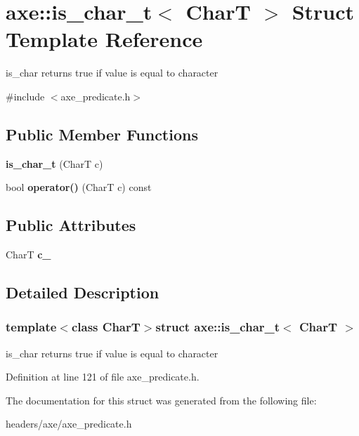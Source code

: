 \hypertarget{structaxe_1_1is__char__t}{\section{axe\+:\+:is\+\_\+char\+\_\+t$<$ Char\+T $>$ Struct Template Reference}
\label{structaxe_1_1is__char__t}
}


is\+\_\+char returns true if value is equal to character  




{\ttfamily \#include $<$axe\+\_\+predicate.\+h$>$}

\subsection*{Public Member Functions}
\begin{DoxyCompactItemize}
\item 
\hypertarget{structaxe_1_1is__char__t_ab077faece6bfee5c0fe9cbf96c6b22ad}{{\bfseries is\+\_\+char\+\_\+t} (Char\+T c)}\label{structaxe_1_1is__char__t_ab077faece6bfee5c0fe9cbf96c6b22ad}

\item 
\hypertarget{structaxe_1_1is__char__t_a4b1b9d98521ee046d0fae5868b6c398a}{bool {\bfseries operator()} (Char\+T c) const }\label{structaxe_1_1is__char__t_a4b1b9d98521ee046d0fae5868b6c398a}

\end{DoxyCompactItemize}
\subsection*{Public Attributes}
\begin{DoxyCompactItemize}
\item 
\hypertarget{structaxe_1_1is__char__t_a036d3145d58a31b553e5cad48391ec54}{Char\+T {\bfseries c\+\_\+}}\label{structaxe_1_1is__char__t_a036d3145d58a31b553e5cad48391ec54}

\end{DoxyCompactItemize}


\subsection{Detailed Description}
\subsubsection*{template$<$class Char\+T$>$struct axe\+::is\+\_\+char\+\_\+t$<$ Char\+T $>$}

is\+\_\+char returns true if value is equal to character 

Definition at line 121 of file axe\+\_\+predicate.\+h.



The documentation for this struct was generated from the following file\+:\begin{DoxyCompactItemize}
\item 
headers/axe/axe\+\_\+predicate.\+h\end{DoxyCompactItemize}
